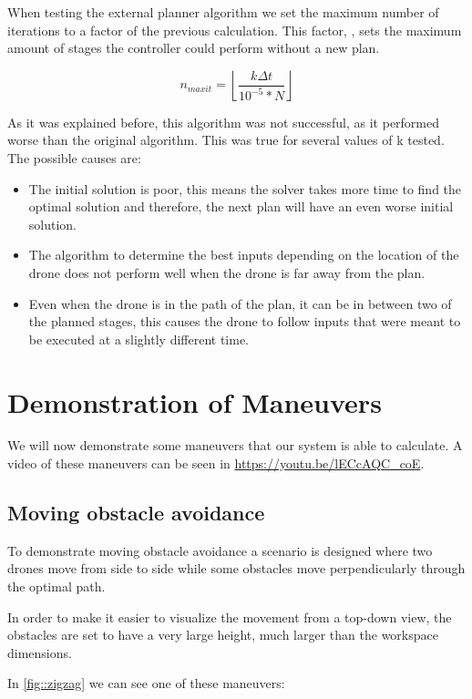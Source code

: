 When testing the external planner algorithm we set the maximum number of iterations to a factor of the previous calculation. This factor, , sets the maximum amount of stages the controller could perform without a new plan. 

\begin{equation}
\label{eq::maxit_k}
n_{maxit}=\left\lfloor\frac{k\Delta t}{10^{-5}*N}\right\rfloor
\end{equation}

As it was explained before, this algorithm was not successful, as it performed worse than the original algorithm. This was true for several values of k tested. The possible causes are:
\begin{itemize}
	\item The initial solution is poor, this means the solver takes more time to find the optimal solution and therefore, the next plan will have an even worse initial solution.
	\item The algorithm to determine the best inputs depending on the location of the drone does not perform well when the drone is far away from the plan.
	\item Even when the drone is in the path of the plan, it can be in between two of the planned stages, this causes the drone to follow inputs that were meant to be executed at a slightly different time.
\end{itemize}

\section{Demonstration of Maneuvers}
We will now demonstrate some maneuvers that our system is able to calculate. A video of these maneuvers can be seen in \url{https://youtu.be/lECcAQC_coE}.

\subsection{Moving obstacle avoidance}
To demonstrate moving obstacle avoidance a scenario is designed where two drones move from side to side while some obstacles move perpendicularly through the optimal path. 

In order to make it easier to visualize the movement from a top-down view, the obstacles are set to have a very large height, much larger than the workspace dimensions.

In \cref{fig::zigzag} we can see one of these maneuvers:

